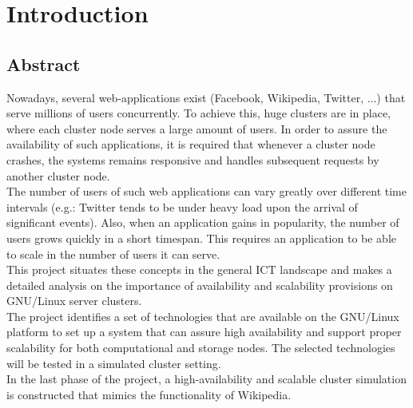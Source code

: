 \documentclass[12pt]{report}
\begin{document}
\chapter{Introduction} %
\section{Abstract}
Nowadays, several web-applications exist (Facebook, Wikipedia, Twitter, ...) that serve millions of users concurrently. To achieve this, huge clusters are in place, where each cluster node serves a large amount of users. In order to assure the availability of such applications, it is required that whenever a cluster node crashes, the systems remains responsive and handles subsequent requests by another cluster node.\\
The number of users of such web applications can vary greatly over different time intervals (e.g.: Twitter tends to be under heavy load upon the arrival of significant events). Also, when an application gains in popularity, the number of users grows quickly in a short timespan. This requires an application to be able to scale in the number of users it can serve.\\
This project situates these concepts in the general ICT landscape and makes a detailed analysis on the importance of availability and scalability provisions on GNU/Linux server clusters.\\
The project identifies a set of technologies that are available on the GNU/Linux platform to set up a system that can assure high availability and support proper scalability for both computational and storage nodes. The selected technologies will be tested in a simulated cluster setting.\\
In the last phase of the project, a high-availability and scalable
cluster simulation is constructed that mimics the functionality of
Wikipedia.
\end{document}
